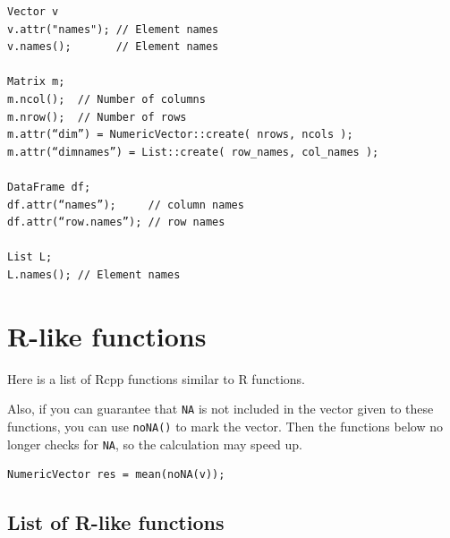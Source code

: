 \documentclass[]{book}
\theoremstyle{definition}
\theoremstyle{definition}
\theoremstyle{remark}
\begin{document}
\begin{verbatim}
Vector v
v.attr("names"); // Element names
v.names();       // Element names

Matrix m;
m.ncol();  // Number of columns
m.nrow();  // Number of rows
m.attr(“dim”) = NumericVector::create( nrows, ncols );
m.attr(“dimnames”) = List::create( row_names, col_names );

DataFrame df;
df.attr(“names”);     // column names
df.attr(“row.names”); // row names

List L;
L.names(); // Element names
\end{verbatim}

\chapter{R-like functions}\label{r-like-functions}

Here is a list of Rcpp functions similar to R functions.

Also, if you can guarantee that \texttt{NA} is not included in the
vector given to these functions, you can use \texttt{noNA()} to mark the
vector. Then the functions below no longer checks for \texttt{NA}, so
the calculation may speed up.

\begin{verbatim}
NumericVector res = mean(noNA(v));
\end{verbatim}

\section{List of R-like functions}\label{list-of-r-like-functions}
\end{document}
